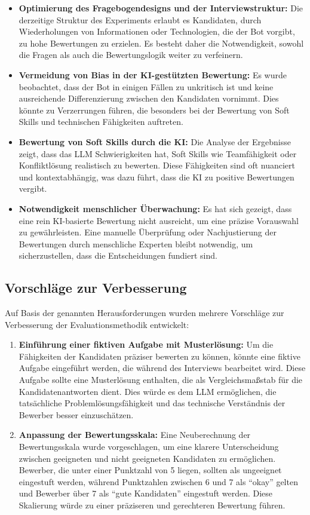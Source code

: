 \begin{itemize}
    \item \textbf{Optimierung des Fragebogendesigns und der Interviewstruktur:} Die derzeitige Struktur des Experiments erlaubt es Kandidaten, durch Wiederholungen von Informationen oder Technologien, die der Bot vorgibt, zu hohe Bewertungen zu erzielen. Es besteht daher die Notwendigkeit, sowohl die Fragen als auch die Bewertungslogik weiter zu verfeinern.
    \item \textbf{Vermeidung von Bias in der \acs{KI}-gestützten Bewertung:} Es wurde beobachtet, dass der Bot in einigen Fällen zu unkritisch ist und keine ausreichende Differenzierung zwischen den Kandidaten vornimmt. Dies könnte zu Verzerrungen führen, die besonders bei der Bewertung von Soft Skills und technischen Fähigkeiten auftreten.
    \item \textbf{Bewertung von Soft Skills durch die \acs{KI}:} Die Analyse der Ergebnisse zeigt, dass das \ac{LLM} Schwierigkeiten hat, Soft Skills wie Teamfähigkeit oder Konfliktlösung realistisch zu bewerten. Diese Fähigkeiten sind oft nuanciert und kontextabhängig, was dazu führt, dass die \acs{KI} zu positive Bewertungen vergibt.
    \item \textbf{Notwendigkeit menschlicher Überwachung:} Es hat sich gezeigt, dass eine rein \acs{KI}-basierte Bewertung nicht ausreicht, um eine präzise Vorauswahl zu gewährleisten. Eine manuelle Überprüfung oder Nachjustierung der Bewertungen durch menschliche Experten bleibt notwendig, um sicherzustellen, dass die Entscheidungen fundiert sind.
\end{itemize}

\subsection{Vorschläge zur Verbesserung}

Auf Basis der genannten Herausforderungen wurden mehrere Vorschläge zur Verbesserung der Evaluationsmethodik entwickelt:

\begin{enumerate}
    \item \textbf{Einführung einer fiktiven Aufgabe mit Musterlösung:} Um die Fähigkeiten der Kandidaten präziser bewerten zu können, könnte eine fiktive Aufgabe eingeführt werden, die während des Interviews bearbeitet wird. Diese Aufgabe sollte eine Musterlösung enthalten, die als Vergleichsmaßstab für die Kandidatenantworten dient. Dies würde es dem \ac{LLM} ermöglichen, die tatsächliche Problemlösungsfähigkeit und das technische Verständnis der Bewerber besser einzuschätzen.
    \item \textbf{Anpassung der Bewertungsskala:} Eine Neuberechnung der Bewertungsskala wurde vorgeschlagen, um eine klarere Unterscheidung zwischen geeigneten und nicht geeigneten Kandidaten zu ermöglichen. Bewerber, die unter einer Punktzahl von 5 liegen, sollten als ungeeignet eingestuft werden, während Punktzahlen zwischen 6 und 7 als \enquote{okay} gelten und Bewerber über 7 als \enquote{gute Kandidaten} eingestuft werden. Diese Skalierung würde zu einer präziseren und gerechteren Bewertung führen.
\end{enumerate}

